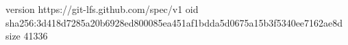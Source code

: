 version https://git-lfs.github.com/spec/v1
oid sha256:3d418d7285a20b6928ed800085ea451af1bdda5d0675a15b3f5340ee7162ae8d
size 41336
